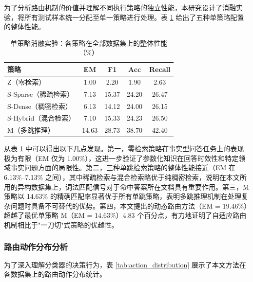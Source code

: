 为了分析路由机制的价值并理解不同执行策略的独立性能，本研究设计了消融实验，将所有测试样本统一分配至单一策略进行处理。表 \ref{tab:ablation_single_strategy} 给出了五种单策略配置的整体性能。


\begin{table}[htbp]
    \centering
    \caption{单策略消融实验：各策略在全部数据集上的整体性能（\%）}
    \label{tab:ablation_single_strategy}
    \renewcommand{\arraystretch}{1.3}
    \begin{tabular}{l c c c c}
        \toprule
        \textbf{策略} & \textbf{EM} & \textbf{F1} & \textbf{Acc} & \textbf{Recall} \\
        \midrule
        Z（零检索） & 1.00 & 2.20 & 1.90 & 2.63 \\
        S-Sparse（稀疏检索） & 7.13 & 15.37 & 24.20 & 26.47 \\
        S-Dense（稠密检索） & 6.13 & 14.12 & 24.00 & 26.15 \\
        S-Hybrid（混合检索） & 7.10 & 15.33 & 24.23 & 26.50 \\
        M（多跳推理） & 14.63 & 28.73 & 38.70 & 42.40 \\
        \bottomrule
    \end{tabular}
\end{table}

从表 \ref{tab:ablation_single_strategy} 中可以得出以下几点发现。第一，零检索策略在事实型问答任务上的表现极为有限（EM 仅为 1.00\%），这进一步验证了参数化知识在回答时效性和特定领域事实问题方面的局限性。第二，三种单跳检索策略的整体性能接近（EM 在 6.13\%--7.13\% 之间），其中稀疏检索与混合检索略优于纯稠密检索，说明在本文所用的异构数据集上，词法匹配信号对于命中答案所在文档具有重要作用。第三，M 策略以 14.63\% 的精确匹配率显著优于所有单跳策略，表明多跳推理机制在处理复杂问题时具备不可替代的优势。第四，本文提出的动态路由方法（EM = 19.46\%）超越了最优单策略 M（EM = 14.63\%）4.83 个百分点，有力地证明了自适应路由机制相比于"一刀切"式策略的优越性。

\subsubsection{路由动作分布分析}

为了深入理解分类器的决策行为，表 \ref{tab:action_distribution} 展示了本文方法在各数据集上的路由动作分布统计。


